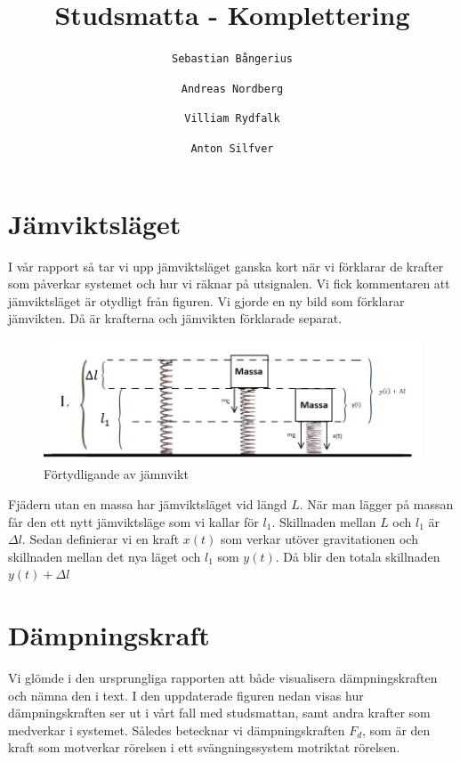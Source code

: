 \documentclass[10pt,a4paper]{article}
\author{
  \texttt{Sebastian Bångerius}
  \and
  \texttt{Andreas Nordberg}
  \and
  \texttt{Villiam Rydfalk}
  \and
  \texttt{Anton Silfver}
}
\begin{document}

\title{Studsmatta - Komplettering}
\maketitle

\cleardoublepage




\section{Jämviktsläget}

I vår rapport så tar vi upp jämviktsläget ganska kort när vi förklarar de krafter som påverkar systemet och hur vi räknar på utsignalen. Vi fick kommentaren att jämviktsläget är otydligt från figuren. Vi gjorde en ny bild som förklarar jämvikten. Då är krafterna och jämvikten förklarade separat.

\begin{figure}[h]
\begin{center}
\includegraphics[scale=0.6]{jamvikt}
\caption{Förtydligande av jämnvikt}
\end{center}
\end{figure}

Fjädern utan en massa har jämviktsläget vid längd $L$. När man lägger på massan får den ett nytt jämviktsläge som vi kallar för $l_1$. Skillnaden mellan $L$ och $l_1$ är $\Delta l$. Sedan definierar vi en kraft $x(t)$ som verkar utöver gravitationen och skillnaden mellan det nya läget och $l_1$ som $y(t)$. Då blir den totala skillnaden $y(t) + \Delta l$

\section{Dämpningskraft}

Vi glömde i den ursprungliga rapporten att både visualisera dämpningskraften och nämna den i text. I den uppdaterade figuren nedan visas hur dämpningskraften ser ut i vårt fall med studsmattan, samt andra krafter som medverkar i systemet. Således betecknar vi dämpningskraften $F_d$, som är den kraft som motverkar rörelsen i ett svängningssystem motriktat rörelsen.
\end{document}
